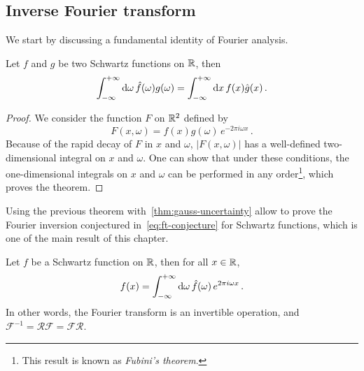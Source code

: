 \subsection{Inverse Fourier transform}
We start by discussing a fundamental identity of Fourier analysis.
\begin{theorem}
  \label{thm:fourier-adj}
  Let $f$ and $g$ be two Schwartz functions on $\mathbb{R}$, then
  \begin{equation}
    \int_{-\infty}^{+\infty}\mathrm{d}{\omega}\,\hat{f}(\omega)g(\omega)=\int_{-\infty}^{+\infty}\mathrm{d}{x}\,f(x)\hat{g}(x)\,.
  \end{equation}
\end{theorem}
\begin{proof}
  We consider the function $F$ on $\mathbb{R}^2$ defined by
  \begin{equation}
    F(x,\omega)=f(x)g(\omega)\,e^{-2\pi i\omega x}\,.
  \end{equation}
  Because of the rapid decay of $F$ in $x$ and $\omega$, $|F(x,\omega)|$ has a
  well-defined two-dimensional integral on $x$ and $\omega$. One can show that under these
  conditions, the one-dimensional integrals on $x$ and $\omega$ can be performed in any
  order\footnote{This result is known as \emph{Fubini's theorem}.}, which proves the
  theorem.
\end{proof}
Using the previous theorem with~\cref{thm:gauss-uncertainty} allow to prove the Fourier
inversion conjectured in~\cref{eq:ft-conjecture} for Schwartz functions, which is one of
the main result of this chapter.
\begin{theorem}
  \label{thm:fourier-inv}
  Let $f$ be a Schwartz function on $\mathbb{R}$, then for all $x\in\mathbb{R}$,
  \begin{equation}
    f(x)=\int_{-\infty}^{+\infty}\mathrm{d}{\omega}\,\hat{f}(\omega)\,e^{2\pi i\omega x}\,.
  \end{equation}
  In other words, the Fourier transform is an invertible operation, and
  $\mathcal{F}^{-1}=\mathcal{R}\mathcal{F}=\mathcal{F}\mathcal{R}$.
\end{theorem}
